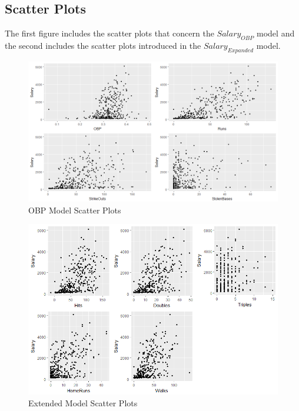 \documentclass[a4paper, 11pt]{article}
\begin{document}
\subsection*{Scatter Plots}
The first figure includes the scatter plots that concern the $Salary_{OBP}$ model and the second includes the scatter plots introduced in the $Salary_{Expanded}$ model.
\vspace{-1em}
\begin{figure}[H]
	\centering
	\caption{OBP Model Scatter Plots}
	\centerline{\includegraphics[width=\textwidth]{scatter_salary.png}}
\end{figure}
\vspace{-1em}
\begin{figure}[H]
	\centering
	\caption{Extended Model Scatter Plots}
	\centerline{\includegraphics[width=\textwidth]{scatter_salary_expanded.png}}
\end{figure}
\end{document}
